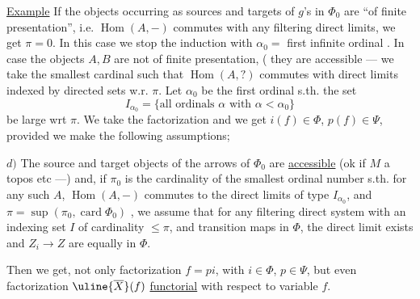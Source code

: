\uline{Example} If the objects occurring as sources and targets of $g$'s in $\Phi_0$ are ``of finite presentation'', i.e. $\operatorname{Hom}(A,-)$ commutes with any filtering direct limits, we get $\pi=0$. In this case we stop the induction with $\alpha_0=$ first infinite ordinal . In case the objects $A,B$ are not of finite presentation, ( they are accessible
--- we take the smallest cardinal such that $\operatorname{Hom}(A,?)$ commutes with direct limits indexed by  directed sets   w.r. $\pi$.
Let  $\alpha_0$ be the first ordinal s.th. the set
\[
I_{\alpha_0}=\{\text{all ordinals }\alpha\text{ with }\alpha<\alpha_0\}
\]
be  large wrt $\pi$. We take the factorization
and we get $i(f)\in\Phi$, $p(f)\in\Psi$, provided we make the following assumptions;

$d)$ The  source and target objects of the arrows of $\Phi_0$ are \uline{accessible}
(ok if $M$ a topos etc ---) and, if $\pi_0$ is the cardinality of the smallest ordinal number  s.th. for any such $A$, $\operatorname{Hom}(A,-)$ commutes to the direct limits of type $I_{\alpha_0}$,  and \deleted{$\pi=\sup(\unsure{\pi}$}
$\pi=\sup(\pi_0,\operatorname{card}\Phi_0)$ , we assume that for any filtering direct system with an indexing set $I$ of cardinality $\leq\pi$, and transition maps in $\Phi$, the direct limit exists and  $Z_i\to Z$ are equally in $\Phi$.

Then we get, not only factorization $f=pi$, with $i\in\Phi$, $p\in\Psi$, but even factorization $\uline{\overline X}(f)$ \uline{functorial} with respect to variable $f$.


